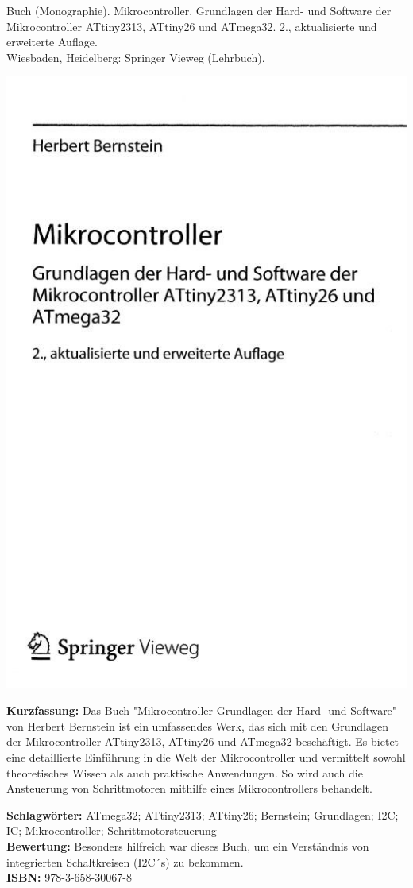 {
Buch (Monographie). Mikrocontroller. Grundlagen der Hard- und Software der Mikrocontroller ATtiny2313, ATtiny26 und ATmega32.
2., aktualisierte und erweiterte Auflage.\\Wiesbaden, Heidelberg: Springer Vieweg (Lehrbuch). \\
\begin{minipage}{0.38\textwidth}
	\includegraphics[width=\linewidth]{images/Bernstein2.jpg}
\end{minipage}
\hfill
\begin{minipage}{0.6\textwidth}
\textbf{Kurzfassung:}
Das Buch "Mikrocontroller Grundlagen der Hard- und Software" von Herbert Bernstein ist ein umfassendes Werk, das sich mit den Grundlagen der Mikrocontroller ATtiny2313, ATtiny26 und ATmega32 beschäftigt. Es bietet eine detaillierte Einführung in die Welt der Mikrocontroller und vermittelt sowohl theoretisches Wissen als auch praktische Anwendungen. So wird auch die Ansteuerung von Schrittmotoren mithilfe eines Mikrocontrollers behandelt.		
\end{minipage}
\textbf{Schlagwörter:}
ATmega32; ATtiny2313; ATtiny26; Bernstein; Grundlagen; I2C; IC; Mikrocontroller; Schrittmotorsteuerung
\\ \textbf{Bewertung:}
Besonders hilfreich war dieses Buch, um ein Verständnis von integrierten Schaltkreisen (I2C´s)  zu bekommen.
\\ \textbf{ISBN:}
978-3-658-30067-8
}

